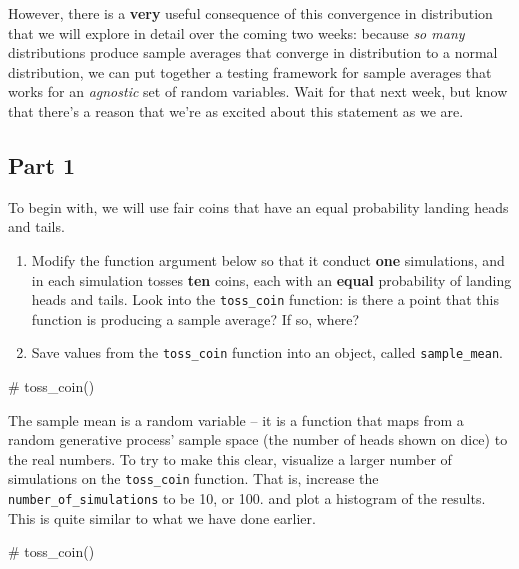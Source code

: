 \documentclass[
  letterpaper,
  DIV=11,
  numbers=noendperiod]{scrreprt}
\newenvironment{Shaded}{\begin{snugshade}}{\end{snugshade}}
\newcommand{\CommentTok}[1]{\textcolor[rgb]{0.37,0.37,0.37}{#1}}
\providecommand{\tightlist}{%
  \setlength{\itemsep}{0pt}\setlength{\parskip}{0pt}}\usepackage{longtable,booktabs,array}
\begin{document}
However, there is a \textbf{very} useful consequence of this convergence
in distribution that we will explore in detail over the coming two
weeks: because \emph{so many} distributions produce sample averages that
converge in distribution to a normal distribution, we can put together a
testing framework for sample averages that works for an \emph{agnostic}
set of random variables. Wait for that next week, but know that there's
a reason that we're as excited about this statement as we are.

\subsection{Part 1}\label{part-1}

To begin with, we will use fair coins that have an equal probability
landing heads and tails.

\begin{enumerate}
\def\labelenumi{\arabic{enumi}.}
\tightlist
\item
  Modify the function argument below so that it conduct \textbf{one}
  simulations, and in each simulation tosses \textbf{ten} coins, each
  with an \textbf{equal} probability of landing heads and tails. Look
  into the \texttt{toss\_coin} function: is there a point that this
  function is producing a sample average? If so, where?
\item
  Save values from the \texttt{toss\_coin} function into an object,
  called \texttt{sample\_mean}.
\end{enumerate}

\begin{Shaded}
\begin{Highlighting}[]
\CommentTok{\# toss\_coin()}
\end{Highlighting}
\end{Shaded}

The sample mean is a random variable -- it is a function that maps from
a random generative process' sample space (the number of heads shown on
dice) to the real numbers. To try to make this clear, visualize a larger
number of simulations on the \texttt{toss\_coin} function. That is,
increase the \texttt{number\_of\_simulations} to be 10, or 100. and plot
a histogram of the results. This is quite similar to what we have done
earlier.

\begin{Shaded}
\begin{Highlighting}[]
\CommentTok{\# toss\_coin()}
\end{Highlighting}
\end{Shaded}
\end{document}
